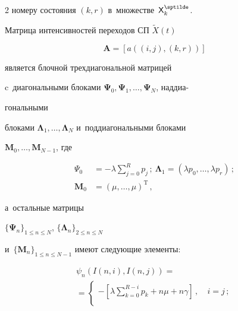 \begin{multicols}{2}
номеру состояния $(k,r)$ в~множестве~${\sf X}_k^{\sptilde}$.

  

  Матрица интенсивностей переходов СП $\tilde{X}(t)$ 

  $$

  \mathbf{A}=  [a((i,j),(k,r))]$$ 

  является блочной трехдиагональной матрицей 

c~диагональными блоками $\boldsymbol{\Psi}_0, 

\boldsymbol{\Psi}_1, \ldots , \boldsymbol{\Psi}_N$, наддиа-\linebreak\vspace*{-12pt}



\pagebreak



\noindent

гональными 

блоками $\boldsymbol{\Lambda}_1,\ldots , \boldsymbol{\Lambda}_N$ и~поддиагональными блоками 

$\mathbf{M}_0,\ldots , \mathbf{M}_{N-1}$, где 

\begin{align*}

\Psi_0&= -\lambda 

\sum\limits_{j=0}^R p_j\,;\ 

 \boldsymbol{\Lambda}_1=\left(\lambda p_0,\ldots, \lambda p_r\right)\,;

\\

\mathbf{M}_0&= \left(\mu, \ldots, \mu\right)^{\mathrm{T}}\,,

\end{align*}

 а~остальные матрицы 

$\{\boldsymbol{\Psi}_n\}_{1\leq n\leq N}$, $\{\boldsymbol{\Lambda}_n\}_{2\leq n\leq N}$ 

и~$\{\mathbf{M}_n\}_{1\leq n\leq N-1}$ имеют следующие элементы:

  \begin{multline}

  \psi_n(I(n,i),I(n,j))={}\\

  {}=\begin{cases}

  \displaystyle-\left[ \lambda \sum\limits_{k=0}^{R-i} p_k 

+n\mu+n\gamma\right]\,, &\ i=j\,;\\[5pt]


\end{cases}
\end{multline}
\end{multicols}
